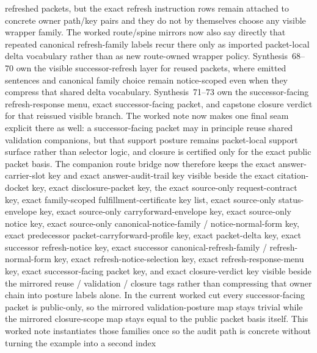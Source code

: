 \documentclass[11pt]{article}
\begin{document}
refreshed packets, but the exact refresh instruction rows remain attached to concrete owner path/key pairs and they do not by themselves choose any visible wrapper family. The worked route/spine mirrors now also say directly that repeated canonical refresh-family labels recur there only as imported packet-local delta vocabulary rather than as new route-owned wrapper policy. Synthesis~68--70 own the visible successor-refresh layer for reused packets, where emitted sentences and canonical family choice remain notice-scoped even when they compress that shared delta vocabulary. Synthesis~71--73 own the successor-facing refresh-response menu, exact successor-facing packet, and capstone closure verdict for that reissued visible branch. The worked note now makes one final seam explicit there as well: a successor-facing packet may in principle reuse shared validation companions, but that support posture remains packet-local support surface rather than selector logic, and closure is certified only for the exact public packet basis. The companion route bridge now therefore keeps the exact answer-carrier-slot key and exact answer-audit-trail key visible beside the exact citation-docket key, exact disclosure-packet key, the exact source-only request-contract key, exact family-scoped fulfillment-certificate key list, exact source-only status-envelope key, exact source-only carryforward-envelope key, exact source-only notice key, exact source-only canonical-notice-family / notice-normal-form key, exact predecessor packet-carryforward-profile key, exact packet-delta key, exact successor refresh-notice key, exact successor canonical-refresh-family / refresh-normal-form key, exact refresh-notice-selection key, exact refresh-response-menu key, exact successor-facing packet key, and exact closure-verdict key visible beside the mirrored reuse / validation / closure tags rather than compressing that owner chain into posture labels alone. In the current worked cut every successor-facing packet is public-only, so the mirrored validation-posture map stays trivial while the mirrored closure-scope map stays equal to the public packet basis itself. This worked note instantiates those families once so the audit path is concrete without turning the example into a second index 
\end{document}

